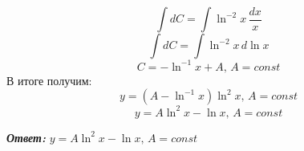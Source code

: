 \documentclass[a5paper, 10pt]{article}
\theoremstyle{definition}
\theoremstyle{plain}
\theoremstyle{remark}
\begin{document}
\begin{equation*}
\int dC  = \int \ln ^{-2} x  \,\frac{dx}{x} 
\end{equation*}
\begin{equation*}
\int dC  = \int \ln ^{-2} x \, d \ln x
\end{equation*}
\begin{equation*}
C  =  - \ln ^{-1} x + A, \, A = const
\end{equation*}
В итоге получим:
\begin{equation*}
  y = (A - \ln ^{-1} x  )  \ln ^2 x, \, A = const
\end{equation*}
\begin{equation*}
  y = A\ln ^2 x - \ln x , \, A = const
\end{equation*}

\textit{\textbf{Ответ:}} $  y = A\ln ^2 x - \ln x , \, A = const$

\newpage
\end{document}
